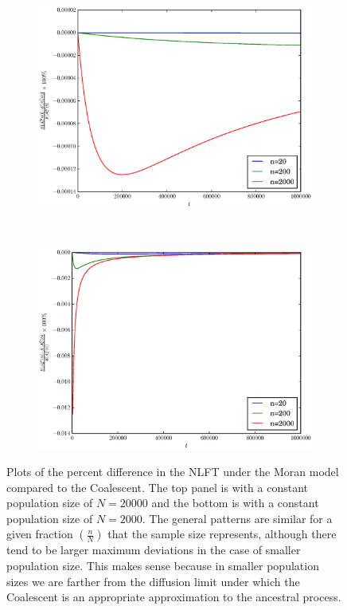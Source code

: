 \documentclass[11pt]{article}
\begin{document}
\begin{center}
	\begin{figure}[!ht]
		\begin{subfigure}[t]{\textwidth}
			\begin{center}
			\includegraphics[scale=0.72]{../plots/moran_figure3}
			\end{center}
		\end{subfigure}
		~
		\begin{subfigure}[t]{\textwidth}
			\begin{center}
			\includegraphics[scale=0.72]{../plots/moran_figure4}
			\end{center}	
		\end{subfigure}
		\caption{Plots of the percent difference in the NLFT under the Moran model compared to the Coalescent. The top panel is with a constant population size of $N=20000$ and the bottom is with a constant population size of $N=2000$. The general patterns are similar for a given fraction $(\frac{n}{N})$ that the sample size represents, although there tend to be larger maximum deviations in the case of smaller population size. This makes sense because in smaller population sizes we are farther from the diffusion limit under which the Coalescent is an appropriate approximation to the ancestral process.}
	\end{figure}
\end{center}
\end{document}
